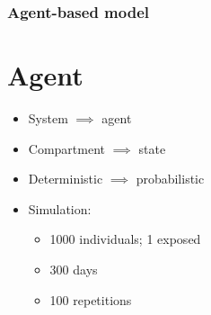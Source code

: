 \documentclass[30pt]{beamer}
\begin{document}
%



\begin{frame}
\frametitle{Agent-based model}
\section{Agent}
%
%      
%       
\begin{itemize}
\item System $\implies$ agent
\item Compartment $\implies$ state
\item Deterministic $\implies$ probabilistic
\item Simulation:
\begin{itemize}
\item 1000 individuals; 1 exposed
\item 300 days
\item 100 repetitions
\end{itemize}
\end{itemize}
\end{frame}
\end{document}
